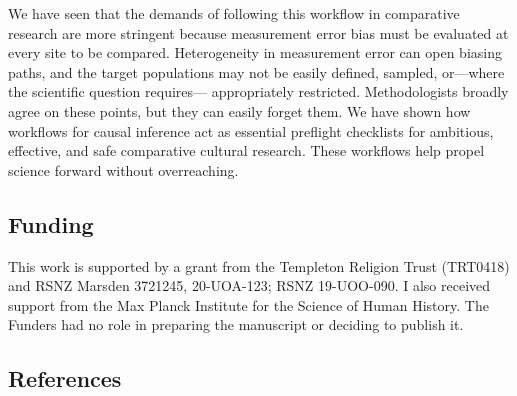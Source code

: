 \documentclass[
  single column]{article}
\begin{document}
We have seen that the demands of following this workflow in comparative
research are more stringent because measurement error bias must be
evaluated at every site to be compared. Heterogeneity in measurement
error can open biasing paths, and the target populations may not be
easily defined, sampled, or---where the scientific question requires---
appropriately restricted. Methodologists broadly agree on these points,
but they can easily forget them. We have shown how workflows for causal
inference act as essential preflight checklists for ambitious,
effective, and safe comparative cultural research. These workflows help
propel science forward without overreaching.

\newpage{}

\subsection{Funding}\label{funding}

This work is supported by a grant from the Templeton Religion Trust
(TRT0418) and RSNZ Marsden 3721245, 20-UOA-123; RSNZ 19-UOO-090. I also
received support from the Max Planck Institute for the Science of Human
History. The Funders had no role in preparing the manuscript or deciding
to publish it.

\newpage{}

\subsection{References}\label{references}
\end{document}
